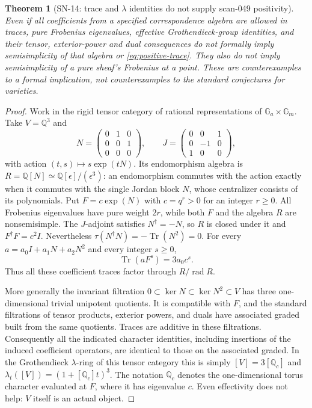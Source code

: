 \documentclass[11pt,a4paper]{article}
\newtheorem{theorem}{Theorem}[section]
\theoremstyle{definition}
\theoremstyle{remark}
\begin{document}
\begin{theorem}[SN-14: trace and $\lambda$ identities do not supply scan-049 positivity]
Even if all coefficients from a specified correspondence algebra are
allowed in traces, pure Frobenius eigenvalues, effective Grothendieck-group
identities, and their tensor, exterior-power and dual consequences do not
formally imply semisimplicity of that algebra or
\eqref{eq:positive-trace}.  They also do not imply semisimplicity of a
pure sheaf's Frobenius at a point.  These are counterexamples to a formal
implication, not counterexamples to the standard conjectures for varieties.
\end{theorem}
\begin{proof}
Work in the rigid tensor category of rational representations of
$\mathbb G_a\times\mathbb G_m$.  Take $V=\mathbb Q^3$ and
\[
 N=\begin{pmatrix}0&1&0\\0&0&1\\0&0&0\end{pmatrix},\qquad
 J=\begin{pmatrix}0&0&1\\0&-1&0\\1&0&0\end{pmatrix},
\]
with action $(t,s)\mapsto s\exp(tN)$.  Its endomorphism algebra is
$R=\mathbb Q[N]\simeq\mathbb Q[\epsilon]/(\epsilon^3)$:
an endomorphism commutes with the action exactly when it commutes with
the single Jordan block $N$, whose centralizer consists of its
polynomials.  Put $F=c\exp(N)$ with $c=q^r>0$ for an integer $r\geq0$.
All Frobenius eigenvalues have pure weight $2r$, while both $F$ and
the algebra $R$ are nonsemisimple.  The $J$-adjoint satisfies
$N^\dagger=-N$, so $R$ is closed under it and $F^\dagger F=c^2I$.
Nevertheless $\tau(N^\dagger N)=-\operatorname{Tr}(N^2)=0$.
For every $a=a_0I+a_1N+a_2N^2$ and every integer $s\geq0$,
\[
 \operatorname{Tr}(aF^s)=3a_0c^s.
\]
Thus all these coefficient traces factor through $R/\operatorname{rad}R$.

More generally the invariant filtration
$0\subset\ker N\subset\ker N^2\subset V$
has three one-dimensional trivial unipotent quotients.  It is compatible with
$F$, and the standard filtrations of tensor products, exterior powers,
and duals have associated graded built from the same quotients.  Traces
are additive in these filtrations.  Consequently all the indicated
character identities, including insertions of the induced coefficient
operators, are identical to those on the associated graded.
In the Grothendieck $\lambda$-ring of this tensor category this is simply
$[V]=3[\mathbb Q_c]$ and
$\lambda_t([V])=(1+[\mathbb Q_c]t)^3$.
The notation $\mathbb Q_c$ denotes the one-dimensional torus character
evaluated at $F$, where it has eigenvalue $c$.
Even effectivity does not help: $V$ itself is an actual object.


\end{proof}
\end{document}
